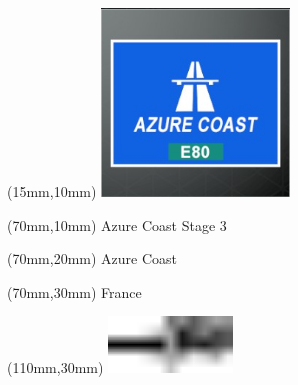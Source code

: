 \null\newpage
\begin{textblock*}{50mm}(15mm,10mm)%
\includegraphics[width=50mm]{LG/2015-05-20_00073.png}
\end{textblock*}
\begin{textblock*}{130mm}(70mm,10mm)%
{\fontsize{20}{20}\selectfont Azure Coast Stage 3}\\
\end{textblock*}
\begin{textblock*}{120mm}(70mm,20mm)%
{\fontsize{16}{16}\selectfont Azure Coast}\\
\end{textblock*}
\begin{textblock*}{120mm}(70mm,30mm)%
{\fontsize{12}{12}\selectfont France}
\end{textblock*}
\begin{textblock*}{30mm}(110mm,30mm)%
\centering
\includegraphics[height=15mm]{icons/tofinish.pdf}
\end{textblock*}
